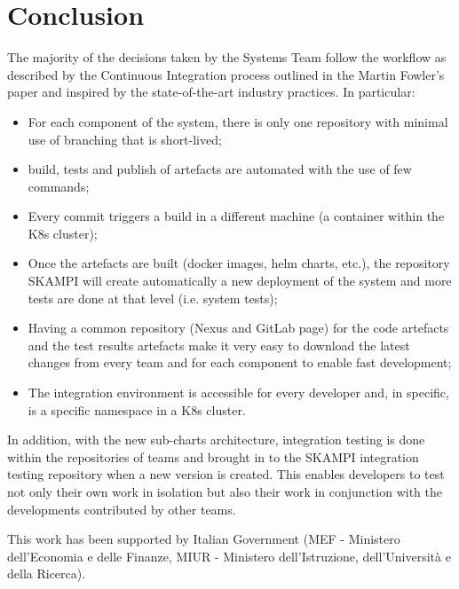\documentclass[a4paper]{spie}  %
\begin{document}
\section{Conclusion}
The majority of the decisions taken by the Systems Team follow the workflow as described by the Continuous Integration process outlined in the Martin Fowler’s paper and inspired by the state-of-the-art industry practices\cite{DevOps, CI, CD}. In particular:
\begin{itemize}
    \item For each component of the system, there is only one repository with minimal use of branching that is short-lived;
    \item build, tests and publish of artefacts are automated with the use of few commands;
    \item Every commit triggers a build in a different machine (a container within the K8s cluster);
    \item Once the artefacts are built (docker images, helm charts, etc.), the repository SKAMPI will create automatically a new deployment of the system and more tests are done at that level (i.e. system tests);
    \item Having a common repository (Nexus and GitLab page) for the code artefacts and the test results artefacts make it very easy to download the latest changes from every team and for each component to enable fast development;
    \item The integration environment is accessible for every developer and, in specific, is a specific namespace in a K8s cluster.
\end{itemize}

In addition, with the new sub-charts architecture, integration testing is done within the repositories of teams and brought in to the SKAMPI integration testing repository when a new version is created.  This enables developers to test not only their own work in isolation but also their work in conjunction with the developments contributed by other teams.

\acknowledgments %

This work has been supported by Italian Government (MEF - Ministero dell'Economia e delle Finanze, MIUR - Ministero dell'Istruzione, dell'Università e della Ricerca).

\end{document}
